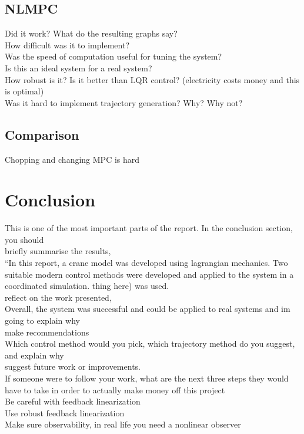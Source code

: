 \documentclass{UoNMCHA}
\numberwithin{equation}{section}
\begin{document}
	\subsection{NLMPC}
	
	Did it work? What do the resulting graphs say?\\
	How difficult was it to implement?\\
	Was the speed of computation useful for tuning the system? \\
	Is this an ideal system for a real system?\\
	How robust is it? Is it better than LQR control? (electricity costs money and this is optimal)\\
	Was it hard to implement trajectory generation? Why? Why not?\\
	
	\subsection{Comparison}
	
	Chopping and changing MPC is hard
	
	\section{Conclusion}
	This is one of the most important parts of the report. In the conclusion section, you should \\
	briefly summarise the results,\\
	“In this report, a crane model was developed using lagrangian mechanics. Two suitable modern control methods were developed and applied to the system in a coordinated simulation. thing here) was used.\\  
	reflect on the work presented,\\
	Overall, the system was successful and could be applied to real systems and im going to explain why\\
	make recommendations\\
	Which control method would you pick, which trajectory method do you suggest, and explain why\\
	suggest future work or improvements.\\
	
	If someone were to follow your work, what are the next three steps they would have to take in order to actually make money off this project\\
	Be careful with feedback linearization\\
	Use robust feedback linearization\\
	Make sure observability, in real life you need a nonlinear observer\\
	
\end{document}
